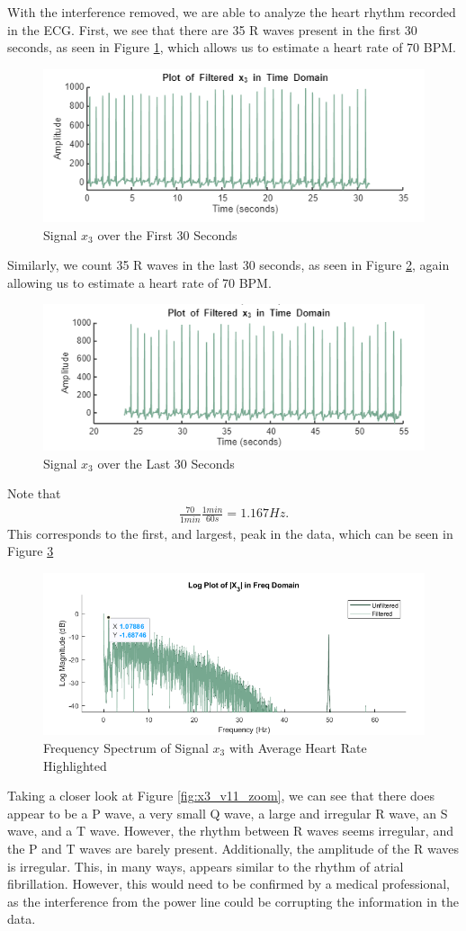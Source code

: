 With the interference removed, we are able to analyze the heart rhythm recorded in the ECG.  First, we see that there are 35 R waves present in the first 30 seconds, as seen in Figure \ref{fig:x3_first30}, which allows us to estimate a heart rate of 70 BPM.


\begin{figure}[H]
    \centering
    \includegraphics[width=0.5\linewidth]{figures/x3_first30sec.png}
    \caption{Signal $x_3$ over the First 30 Seconds}
    \label{fig:x3_first30}
\end{figure}

Similarly, we count 35 R waves in the last 30 seconds, as seen in Figure \ref{fig:x3_last30}, again allowing us to estimate a heart rate of 70 BPM.

\begin{figure}[H]
    \centering
    \includegraphics[width=0.5\linewidth]{figures/x3_last30sec.png}
    \caption{Signal $x_3$ over the Last 30 Seconds}
    \label{fig:x3_last30}
\end{figure}

Note that
\begin{align*}
    \frac{70}{1 \unit{min}} \frac{1 \unit{min}}{60 \unit{s}} = 1.167 \unit{Hz}.
\end{align*}
This corresponds to the first, and largest, peak in the data, which can be seen in Figure \ref{fig:x3_avg}
\begin{figure}
    \centering
    \includegraphics[width=0.5\linewidth]{figures/x3_avg.png}
    \caption{Frequency Spectrum of Signal $x_3$ with Average Heart Rate Highlighted}
    \label{fig:x3_avg}
\end{figure}

Taking a closer look at Figure \ref{fig:x3_v11_zoom}, we can see that there does appear to be a P wave, a very small Q wave, a large and irregular R wave, an S wave, and a T wave.  However, the rhythm between R waves seems irregular, and the  P and T waves are barely present.  Additionally, the amplitude of the R waves is irregular.  This, in many ways, appears similar to the rhythm of atrial fibrillation.  However, this would need to be confirmed by a medical professional, as the interference from the power line could be corrupting the information in the data.